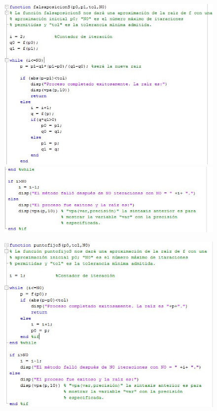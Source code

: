 \begin{figure}[h!]
\centering
  \includegraphics[width=1\textwidth]{FalsaC1.JPG}
  \includegraphics[width=1\textwidth]{FalsaC2.JPG}
\end{figure} 

\begin{figure}[h!]
\centering
  \includegraphics[width=1\textwidth]{PFijoC.JPG}
\end{figure} 

